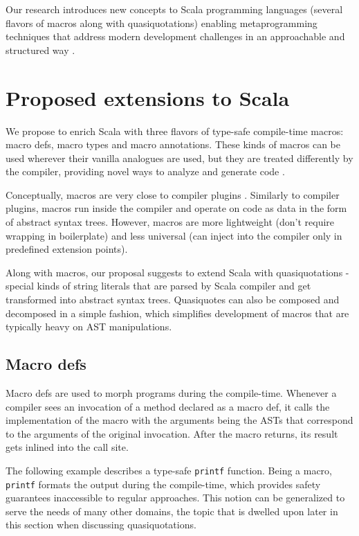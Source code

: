 \documentclass{llncs}
\begin{document}
Our research introduces new concepts to Scala programming languages (several flavors of macros along with quasiquotations)
enabling metaprogramming techniques that address modern development challenges in an approachable and structured way \cite{kepler12a}.

\section{Proposed extensions to Scala}

We propose to enrich Scala with three flavors of type-safe compile-time macros: macro defs, macro types and macro annotations.
These kinds of macros can be used wherever their vanilla analogues are used, but they are treated differently by the compiler,
providing novel ways to analyze and generate code \cite{kepler12a}.

Conceptually, macros \cite{sheard02,skalski05,steele90} are very close to compiler plugins \cite{spoon08}.
Similarly to compiler plugins, macros run inside the compiler and operate on code as data in the form of abstract syntax trees.
However, macros are more lightweight (don't require wrapping in boilerplate) and less universal (can inject into the compiler only in predefined extension points).

Along with macros, our proposal suggests to extend Scala with quasiquotations \cite{skalski05,bawden99,mainland07} - special kinds of string literals that are parsed by Scala compiler
and get transformed into abstract syntax trees. Quasiquotes can also be composed and decomposed in a simple fashion, which simplifies development of macros
that are typically heavy on AST manipulations.

\subsection{Macro defs}

Macro defs are used to morph programs during the compile-time. Whenever a compiler sees an invocation of a method declared as a macro def,
it calls the implementation of the macro with the arguments being the ASTs that correspond to the arguments of the original invocation.
After the macro returns, its result gets inlined into the call site.

The following example describes a type-safe \texttt{printf} function. Being a macro, \texttt{printf} formats the output during the compile-time,
which provides safety guarantees inaccessible to regular approaches. This notion can be generalized to serve the needs of many other domains,
the topic that is dwelled upon later in this section when discussing quasiquotations.
\end{document}
